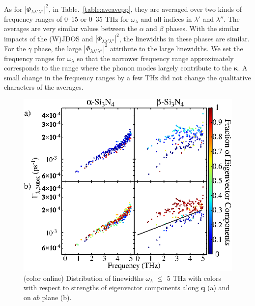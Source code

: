 \documentclass[twocolumn,amsmath,amssymb,a4paper,prb,superscriptaddress,floatfix]{revtex4-1}
\begin{document}
As for $|\Phi_{\lambda\lambda'\lambda''}|^2$, in Table.~\ref{table:aveavepp},
they are averaged over two kinds of frequency ranges of 0--15 or 0--35 THz for
$\omega_\lambda$ and all indices in $\lambda'$ and $\lambda''$.  The averages
are very similar values between the $\alpha$ and $\beta$ phases. With the
similar impacts of the (W)JDOS and $|\Phi_{\lambda\lambda'\lambda''}|^2$, the
linewidths in these phases are similar.  For the $\gamma$ phase, the large
$|\Phi_{\lambda\lambda'\lambda''}|^2$ attribute to the large linewidths.  We set
the frequency ranges for $\omega_\lambda$ so that the narrower frequency range
approximately corresponds to the range where the phonon modes largely contribute
to the $\boldsymbol{\kappa}$. A small change in the frequency ranges by a few
THz did not change the qualitative characters of the averages.  

\begin{figure}[ht]
 \centering
  \includegraphics[width=\linewidth]{figure_analyze_gamma3_m1010_print.eps} \caption{(color
	  online) Distribution of linewidths $\omega_\lambda$ $\leq$ 5 THz
		  with colors with respect to strengths of eigenvector components along $\mathbf q$ (a)
		  and on $ab$ plane (b).} \label{fig:Fig7_338} 
 \centering
\end{figure}
\end{document}
